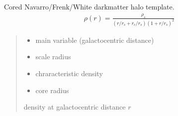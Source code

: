 \documentclass[letterpaper,10pt,english]{sphinxmanual}
\begin{document}
\begin{fulllineitems}
\label{\detokenize{diffsph.profiles:diffsph.profiles.templates.cnfw}}
\pysigstartsignatures
{}
\pysigstopsignatures
\sphinxAtStartPar
Cored Navarro/Frenk/White dark\sphinxhyphen{}matter halo template.
\begin{equation*}
\begin{split}\rho(r) = \frac{\rho_s}{(r/r_s+r_c/r_s)(1+r/r_s)^2}\end{split}
\end{equation*}\begin{quote}\begin{description}
\begin{itemize}
\item {} 
\sphinxAtStartPar
{} \textendash{} main variable (galactocentric distance)

\item {} 
\sphinxAtStartPar
{} \textendash{} scale radius

\item {} 
\sphinxAtStartPar
{} \textendash{} chraracteristic density

\item {} 
\sphinxAtStartPar
{} \textendash{} core radius

\end{itemize}

\sphinxAtStartPar
density at galactocentric distance \(r\)

\end{description}\end{quote}

\end{fulllineitems}

\end{document}
